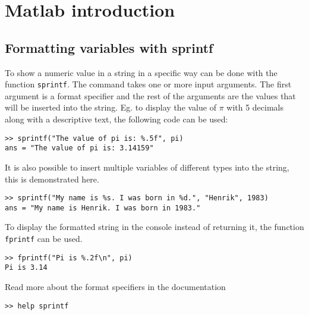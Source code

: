 \section{Matlab introduction}




\subsection{Formatting variables with sprintf}

To show a numeric value in a string in a specific way can be 
done with the function \verb!sprintf!.
The command takes one or more input arguments.
The first argument is a format specifier and the rest
of the arguments are the values that will be inserted 
into the string.
Eg. to display the value of $\pi$ with 5 decimals
along with a descriptive text, the following code 
can be used:
\begin{lstlisting}
>> sprintf("The value of pi is: %.5f", pi)
ans = "The value of pi is: 3.14159"
\end{lstlisting}
It is also possible to insert multiple variables
of different types into the string, this is demonstrated 
here.
\begin{lstlisting}
>> sprintf("My name is %s. I was born in %d.", "Henrik", 1983)
ans = "My name is Henrik. I was born in 1983."
\end{lstlisting}
To display the formatted string in the console
instead of returning it, the function
\verb!fprintf! can be used.
\begin{lstlisting}
>> fprintf("Pi is %.2f\n", pi)
Pi is 3.14
\end{lstlisting}
Read more about the format specifiers in the documentation
\begin{lstlisting}
>> help sprintf
\end{lstlisting}




